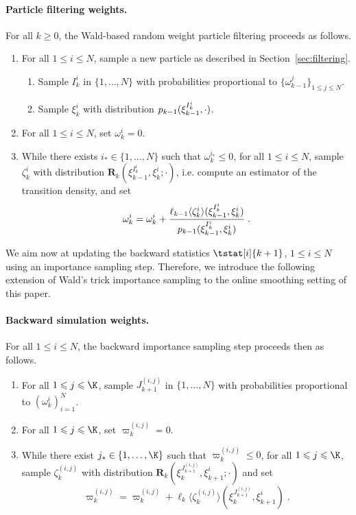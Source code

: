 \documentclass[12pt]{article}
\newcommand{\N}{N}
\newcommand{\bi}[3]{J_{#1}^{(#2, #3)}}
\newcommand{\kissforward}[3][]
{\ifthenelse{\equal{#1}{}}{p_{#2}}
{\ifthenelse{\equal{#1}{fully}}{p^{\star}_{#2}}
{\ifthenelse{\equal{#1}{smooth}}{\tilde{r}_{#2}}{\mathrm{erreur}}}}}
\newcommand{\adjfuncforward}[1]{\vartheta_{#1}}
\newcommand{\eqsp}{\;}
\newcommand{\ewght}[2]{\ensuremath{\omega_{#1}^{#2}}}
\newcommand{\epart}[2]{\ensuremath{\xi_{#1}^{#2}}}
\newcommand{\kernelmarg}{\mathbf{R}}
\newcommand{\hatqg}[1]{\mathsf{\ell}_{#1}}
\begin{document}
\paragraph{Particle filtering weights.}  
For all $k\geqslant 0$, the Wald-based random weight particle filtering proceeds as follows.
\begin{enumerate}
\item For all $1\leqslant i\leqslant \N$, sample a new particle as described in Section~\ref{sec:filtering}.
\begin{enumerate}
\item Sample $I_k^{i}$ in $\{1,\ldots,\N\}$ with probabilities proportional to $\{\ewght{k-1}{j} 
\}_{1\leqslant j\leqslant \N}$.
\item Sample $\epart{k}{i}$ with distribution $\kissforward{k-1}{k-1}(\epart{k-1}{I_k^{i}},\cdot)$.
\end{enumerate}
\item For all $1\leqslant i\leqslant \N$, set  $\ewght{k}{i}= 0$.
\item While there exists $i_* \in\{1,\ldots,\N\}$ such that $\ewght{k}{i_*} \leqslant 0$, for all $1\leqslant i\leqslant \N$, sample $\zeta_k^{i}$ with distribution $\kernelmarg_{k}(\epart{k-1}{I_k^{i}},\epart{k}{i};\cdot)$, i.e. compute an estimator of the transition density, and set 
$$
\ewght{k}{i}  = \ewght{k}{i} + \frac{\hatqg{k-1}\langle \zeta_k^i\rangle(\epart{k-1}{I_k^{i}},\epart{k}{i}) }{\kissforward{k-1}{k-1}(\epart{k-1}{I_k^{i}},\epart{k}{i})}\eqsp.
$$
\end{enumerate}
We aim now at updating the backward statistics $\tstat[i]{k+1}$, $1\leqslant i \leqslant N$ using an importance sampling step. %
Therefore, we introduce the following extension of Wald's trick importance sampling to the online smoothing setting of this paper.

\paragraph{Backward simulation weights.} For all $1\leqslant i\leqslant \N$, the backward importance sampling step proceeds then as follows.
\begin{enumerate}
\item For all $1\leqslant j\leqslant \K$,   sample $J_{k+1}^{(i,j)}$ in $\{1,\ldots, \N\}$ with probabilities proportional to  $(\omega^{i}_k)_{i=1}^{\N}$. 
\item For all $1\leqslant j\leqslant \K$, set  $\varpi_k^{(i,j)}= 0$.
\item While there exist $j_* \in\{1,\ldots,\K\}$ such that $\varpi_k^{(i,j)} \leqslant 0$, for all $1\leqslant j\leqslant \K$, sample $\zeta_k^{(i,j)}$  with distribution $\kernelmarg_{k}(\epart{k}{J_{k+1}^{(i,j)}}, \epart{k+1}{i};\cdot)$ and set 
$$
\varpi_k^{(i,j)} = \varpi_k^{(i,j)} +  \hatqg{k}\langle \zeta_k^{(i,j)} \rangle(\epart{k}{J_{k+1}^{(i,j)}}, \epart{k+1}{i})\eqsp.
$$
\end{enumerate}
\end{document}
